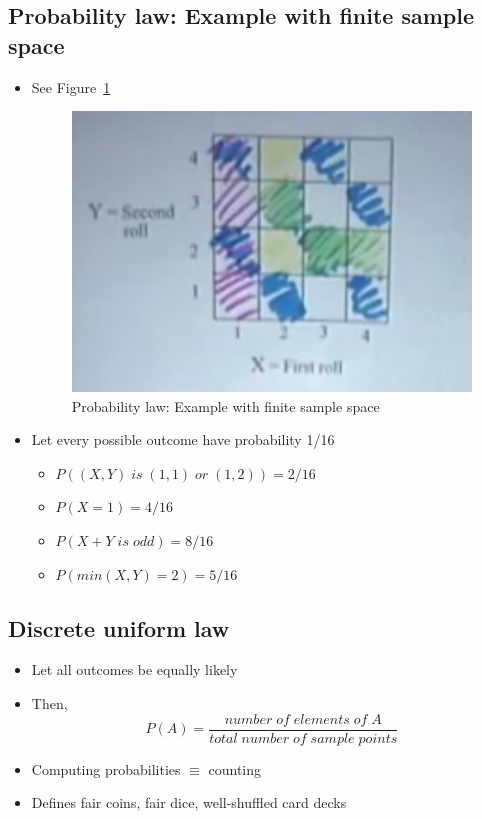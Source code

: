 \subsection{Probability law: Example with finite sample space}
    \begin{itemize}
        \item See Figure~\ref{fig:1-8}
        \begin{figure}[h!]
            \centering
            \includegraphics[scale=0.7]{images/1-8}
            \caption{Probability law: Example with finite sample space}
            \label{fig:1-8}
        \end{figure}
        
        \item Let every possible outcome have probability 1/16
        \begin{itemize}
            \item $ P((X,Y) \; is \; (1,1) \; or \; (1,2)) = 2/16$
            \item $ P({X=1}) =  4/16$
            \item $ P(X+Y \; is \; odd) = 8/16$
            \item $ P(min(X,Y)=2) = 5/16$
        \end{itemize}
    \end{itemize}

\subsection{Discrete uniform law}
    \begin{itemize}
        \item Let all outcomes be equally likely
        \item Then, 
        $$
        P(A) = \frac{number \; of \; elements \; of \; A}{total  \; number \; of \; sample \; points}
        $$
        \item Computing probabilities $\equiv$ counting
        \item Defines fair coins, fair dice, well-shuffled card decks
    \end{itemize}

